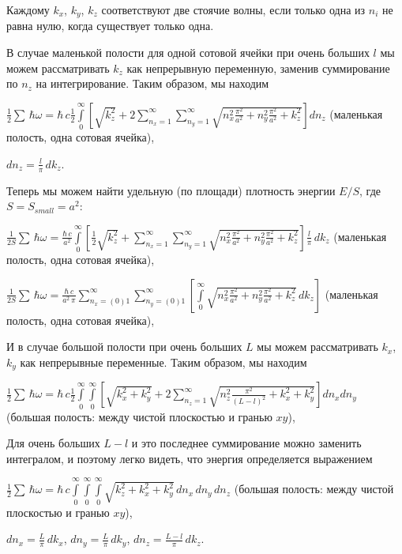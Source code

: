 \documentclass[11pt]{article}
\begin{document}
    Каждому \(k_x\), \(k_y\), \(k_z\) соответствуют две стоячие волны, если
только одна из \(n_i\) не равна нулю, когда существует только одна.

В случае маленькой полости для одной сотовой ячейки при очень больших
\(l\) мы можем рассматривать \(k_z\) как непрерывную переменную, заменив
суммирование по \(n_z\) на интегрирование. Таким образом, мы находим

\(\frac{1}{2}\sum\,\hbar\omega = \hbar\,c\frac{1}{2}\int\limits_{0}^{\infty}\left[{\sqrt{k_z^2}+2\sum\limits_{n_x=1}^{\infty}\sum\limits_{n_y=1}^{\infty}\sqrt{n_x^2\frac{\pi^2}{a^2}+n_y^2\frac{\pi^2}{a^2}+k_z^2}}\right]d{n_z}\)
(маленькая полость, одна сотовая ячейка),

\(dn_z = \frac{l}{\pi}\,dk_z\).

    Теперь мы можем найти удельную (по площади) плотность энергии \(E/S\),
где \(S = S_{small} = a^2\):

    \(\frac{1}{2 S}\sum\,\hbar\omega = \frac{\hbar\,c}{a^2}\int\limits_{0}^{\infty}\left[{\frac{1}{2}\sqrt{k_z^2}+\sum\limits_{n_x=1}^{\infty}\sum\limits_{n_y=1}^{\infty}\sqrt{n_x^2\frac{\pi^2}{a^2}+n_y^2\frac{\pi^2}{a^2}+k_z^2}}\right]\frac{l}{\pi}\,dk_z\)
(маленькая полость, одна сотовая ячейка),

    \(\frac{1}{2 S}\sum\,\hbar\omega = \frac{\hbar\,c}{a^2\,\pi}\sum\limits_{n_x=(0)1}^{\infty}\sum\limits_{n_y=(0)1}^{\infty}\left[\int\limits_{0}^{\infty}\sqrt{n_x^2\frac{\pi^2}{a^2}+n_y^2\frac{\pi^2}{a^2}+k_z^2}\,dk_z\right]\)
(маленькая полость, одна сотовая ячейка),

    И в случае большой полости при очень больших \(L\) мы можем
рассматривать \(k_x\), \(k_y\) как непрерывные переменные. Таким
образом, мы находим

\(\frac{1}{2}\sum\,\hbar\omega = \hbar\,c\frac{1}{2}\int\limits_{0}^{\infty}\int\limits_{0}^{\infty}\left[{\sqrt{k_x^2+k_y^2}+2\sum\limits_{n_z=1}^{\infty}\sqrt{n_z^2\frac{\pi^2}{(L-l)^2}+k_x^2+k_y^2}}\right]d{n_x}d{n_y}\)
(большая полость: между чистой плоскостью и гранью \(xy\)),

Для очень больших \(L-l\) и это последнее суммирование можно заменить
интегралом, и поэтому легко видеть, что энергия определяется выражением

\(\frac{1}{2}\sum\,\hbar\omega = \hbar\,c\int\limits_{0}^{\infty}\int\limits_{0}^{\infty}\int\limits_{0}^{\infty}\sqrt{k_z^2+k_x^2+k_y^2}\,d{n_x}\,d{n_y}\,d{n_z}\)
(большая полость: между чистой плоскостью и гранью \(xy\)),

\(dn_x = \frac{L}{\pi}\,dk_x\), \(dn_y = \frac{L}{\pi}\,dk_y\),
\(dn_z = \frac{L-l}{\pi}\,dk_z\).
\end{document}
